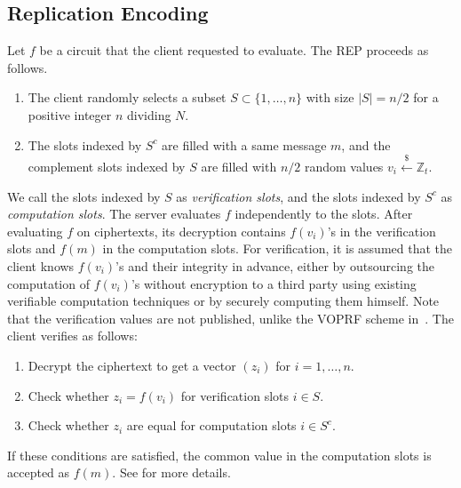 \documentclass[runningheads]{llncs}
\newcommand{\bb}[1]{\mathbb{#1}}  %
\newcommand{\REP}{\textsf{REP}{}}
\begin{document}
    \subsection{Replication Encoding}
    Let $f$ be a circuit that the client requested to evaluate. The \REP{} proceeds as follows. 
        \begin{enumerate}
            \item The client randomly selects a subset $S \subset \{1, \dots, n\}$ with size $|S|=n/2$ for a positive integer $n$ dividing $N$.
            \item The slots indexed by $S^c$ are filled with a same message $m$, and the complement slots indexed by $S$ are filled with $n/2$ random values $v_i\overset{\$}{\gets} \bb Z_t$. 
        \end{enumerate}
    We call the slots indexed by $S$ as \emph{verification slots}, and the slots indexed by $S^c$ as \emph{computation slots}.
    The server evaluates $f$ independently to the slots. 
    After evaluating $f$ on ciphertexts, its decryption contains $f(v_i)$'s in the verification slots and $f(m)$ in the computation slots.
    For verification, it is assumed that the client knows $f(v_i)$'s and their integrity in advance, either by outsourcing the computation of $f(v_i)$'s without encryption to a third party using existing verifiable computation techniques or by securely computing them himself. Note that the verification values are not published, unlike the VOPRF scheme in~\cite{cryptoeprint:PRF}. The client verifies as follows:
        \begin{enumerate}
            \item Decrypt the ciphertext to get a vector $(z_i)$ for $i=1,\dots, n$.
            \item Check whether $z_i=f(v_i)$ for verification slots $i\in S$.
            \item Check whether $z_i$ are equal for computation slots $i\in S^c$.
        \end{enumerate}
    If these conditions are satisfied, the common value in the computation slots is accepted as $f(m)$.
    See \cite{VE} for more details.
 
\end{document}
